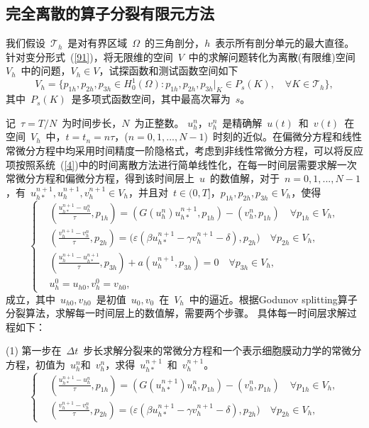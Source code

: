 \documentclass[twoside,UTF8]{nputhesis}
\begin{document}
\subsection{完全离散的算子分裂有限元方法}
我们假设~$\mathcal {T}_h$~是对有界区域~$\Omega$~的三角剖分，$h$~表示所有剖分单元的最大直径。针对变分形式~(\ref{91})，将无限维的空间~$V$~中的求解问题转化为离散(有限维)空间~$V_h$~中的问题，$V_h\in V$，试探函数和测试函数空间如下
\begin{equation*}
V_h=\{p_{1h},p_{2h},p_{3h}\in H_0^1(\Omega):p_{1h},p_{2h},p_{3h}|_K\in P_s(K),\quad\forall K\in \mathcal {T}_h\},
\label{hs}
\end{equation*}
其中~$P_s(K)$~是多项式函数空间，其中最高次幂为~$s$。

记~$\tau=T/N$~为时间步长，$N$~为正整数。 $u^n_h$，$v^n_h$~是精确解~$u(t)$~和~$v(t)$~在空间~$V_h$~中，$t=t_{n}=n\tau$，($n=0,1,...,N-1$)~时刻的近似。在偏微分方程和线性常微分方程中均采用时间精度一阶隐格式，考虑到非线性常微分方程，可以将反应项按照系统~(\ref{4})中的时间离散方法进行简单线性化，在每一时间层需要求解一次常微分方程和偏微分方程，得到该时间层上~$u$~的数值解，对于~$n=0,1,...,N-1$，有~$u^{n+1}_{h*}, u^{n+1}_{h}, v^{n+1}_{h}\in V_h$，并且对~$t\in (0,T]$，$p_{1h}, p_{2h}, p_{3h}\in V_h$，使得
\begin{equation}
\left\{\begin{aligned}&(\frac{u^{n+1}_{h*}-u^n_{h}}{\tau},p_{1h})=(G(u^{n}_{h})u^{n+1}_{h*},p_{1h})-(v^n_{h},p_{1h})\quad \forall  p_{1h}\in V_h,
\\&(\frac{v^{n+1}_{h}-v^n_{h}}{\tau},p_{2h})=\big(\varepsilon(\beta u^{n+1}_{h*}-\gamma v^{n+1}_{h}-\delta),p_{2h}\big)\quad \forall p_{2h}\in V_h,
\\&(\frac{u^{n+1}_{h}-u^{n+1}_{h*}}{\tau},p_{3h})+a(u^{n+1}_{h},p_{3h})=0\quad \forall p_{3h}\in V_h,
\\&u^0_h=u_{h0}, v^0_h=v_{h0},\end{aligned}\right.
\label{92}
\end{equation}
成立，其中~$u_{h0},v_{h0}$~是初值~$u_0,v_0$~在~$V_h$~中的逼近。根据Godunov splitting算子分裂算法，求解每一时间层上的数值解，需要两个步骤。
具体每一时间层求解过程如下：

(1) 第一步在~$\Delta t$~步长求解分裂来的常微分方程和一个表示细胞膜动力学的常微分方程，初值为~$u^n_{h}$和~$v^n_{h}$，求得~$u^{n+1}_{h*}$~和~$v^{n+1}_{h}$。
\begin{equation}
\left\{\begin{aligned}&(\frac{u^{n+1}_{h*}-u^n_h}{\tau},p_{1h})=(G(u^{n+1}_{h*})u^{n}_h,p_{1h})-(v^n_h,p_{1h})\quad \forall  p_{1h}\in V_h,
\\&(\frac{v^{n+1}_{h}-v^n_{h}}{\tau},p_{2h})=\big(\varepsilon(\beta u^{n+1}_{h*}-\gamma v^{n+1}_{h}-\delta),p_{2h}\big)\quad \forall p_{2h}\in V_h,\end{aligned}\right.
\label{93}
\end{equation} 
\end{document}
